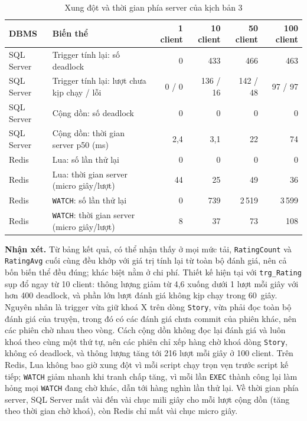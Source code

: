\begin{table}[H]
\centering\small
\begin{tabular}{|l|l|r|r|r|r|}
\hline
\textbf{DBMS} & \textbf{Biến thể} & \textbf{1 client} & \textbf{10 client} & \textbf{50 client} & \textbf{100 client} \\ \hline
SQL Server & Trigger tính lại: số deadlock & 0 & 433 & 466 & 463 \\ \hline
SQL Server & Trigger tính lại: lượt chưa kịp chạy / lỗi & 0 / 0 & 136 / 16 & 142 / 48 & 97 / 97 \\ \hline
SQL Server & Cộng dồn: số deadlock & 0 & 0 & 0 & 0 \\ \hline
SQL Server & Cộng dồn: thời gian server p50 (ms) & 2,4 & 3,1 & 22 & 74 \\ \hline
Redis & Lua: số lần thử lại & 0 & 0 & 0 & 0 \\ \hline
Redis & Lua: thời gian server (micro giây/lượt) & 44 & 25 & 49 & 36 \\ \hline
Redis & \texttt{WATCH}: số lần thử lại & 0 & 739 & 2\,519 & 3\,599 \\ \hline
Redis & \texttt{WATCH}: thời gian server (micro giây/lượt) & 8 & 37 & 73 & 108 \\ \hline
\end{tabular}
\caption{Xung đột và thời gian phía server của kịch bản 3}
\label{tab:tx-t3-conflict}
\end{table}

\textbf{Nhận xét.} Từ bảng kết quả, có thể nhận thấy ở mọi mức tải, \texttt{RatingCount} và \texttt{RatingAvg} cuối cùng đều khớp với giá trị tính lại từ toàn bộ đánh giá, nên cả bốn biến thể đều đúng; khác biệt nằm ở chi phí. Thiết kế hiện tại với \texttt{trg\_Rating} sụp đổ ngay từ 10 client: thông lượng giảm từ 4,6 xuống dưới 1 lượt mỗi giây với hơn 400 deadlock, và phần lớn lượt đánh giá không kịp chạy trong 60~giây. Nguyên nhân là trigger vừa giữ khoá X trên dòng \texttt{Story}, vừa phải đọc toàn bộ đánh giá của truyện, trong đó có các đánh giá chưa commit của phiên khác, nên các phiên chờ nhau theo vòng. Cách cộng dồn không đọc lại đánh giá và luôn khoá theo cùng một thứ tự, nên các phiên chỉ xếp hàng chờ khoá dòng \texttt{Story}, không có deadlock, và thông lượng tăng tới 216 lượt mỗi giây ở 100 client. Trên Redis, Lua không bao giờ xung đột vì mỗi script chạy trọn vẹn trước script kế tiếp; \texttt{WATCH} giảm nhanh khi tranh chấp tăng, vì mỗi lần \texttt{EXEC} thành công lại làm hỏng mọi \texttt{WATCH} đang chờ khác, dẫn tới hàng nghìn lần thử lại. Về thời gian phía server, SQL Server mất vài đến vài chục mili giây cho mỗi lượt cộng dồn (tăng theo thời gian chờ khoá), còn Redis chỉ mất vài chục micro giây.

